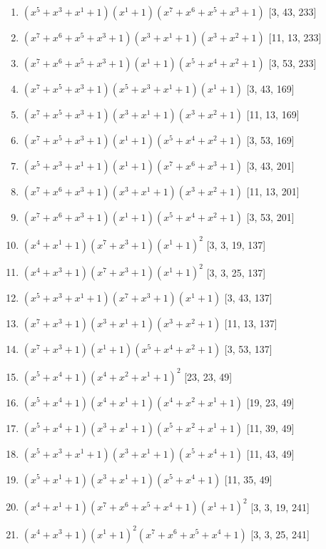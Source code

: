\documentclass[10pt,twocolumn]{article}
\begin{document}
\begin{enumerate}
\item $(x^{5} + x^{3} + x^{1} + 1)(x^{1} + 1)(x^{7} + x^{6} + x^{5} + x^{3} + 1)$  [3, 43, 233]
\item $(x^{7} + x^{6} + x^{5} + x^{3} + 1)(x^{3} + x^{1} + 1)(x^{3} + x^{2} + 1)$  [11, 13, 233]
\item $(x^{7} + x^{6} + x^{5} + x^{3} + 1)(x^{1} + 1)(x^{5} + x^{4} + x^{2} + 1)$  [3, 53, 233]
\item $(x^{7} + x^{5} + x^{3} + 1)(x^{5} + x^{3} + x^{1} + 1)(x^{1} + 1)$  [3, 43, 169]
\item $(x^{7} + x^{5} + x^{3} + 1)(x^{3} + x^{1} + 1)(x^{3} + x^{2} + 1)$  [11, 13, 169]
\item $(x^{7} + x^{5} + x^{3} + 1)(x^{1} + 1)(x^{5} + x^{4} + x^{2} + 1)$  [3, 53, 169]
\item $(x^{5} + x^{3} + x^{1} + 1)(x^{1} + 1)(x^{7} + x^{6} + x^{3} + 1)$  [3, 43, 201]
\item $(x^{7} + x^{6} + x^{3} + 1)(x^{3} + x^{1} + 1)(x^{3} + x^{2} + 1)$  [11, 13, 201]
\item $(x^{7} + x^{6} + x^{3} + 1)(x^{1} + 1)(x^{5} + x^{4} + x^{2} + 1)$  [3, 53, 201]
\item $(x^{4} + x^{1} + 1)(x^{7} + x^{3} + 1)(x^{1} + 1)^{2}$  [3, 3, 19, 137]
\item $(x^{4} + x^{3} + 1)(x^{7} + x^{3} + 1)(x^{1} + 1)^{2}$  [3, 3, 25, 137]
\item $(x^{5} + x^{3} + x^{1} + 1)(x^{7} + x^{3} + 1)(x^{1} + 1)$  [3, 43, 137]
\item $(x^{7} + x^{3} + 1)(x^{3} + x^{1} + 1)(x^{3} + x^{2} + 1)$  [11, 13, 137]
\item $(x^{7} + x^{3} + 1)(x^{1} + 1)(x^{5} + x^{4} + x^{2} + 1)$  [3, 53, 137]
\item $(x^{5} + x^{4} + 1)(x^{4} + x^{2} + x^{1} + 1)^{2}$  [23, 23, 49]
\item $(x^{5} + x^{4} + 1)(x^{4} + x^{1} + 1)(x^{4} + x^{2} + x^{1} + 1)$  [19, 23, 49]
\item $(x^{5} + x^{4} + 1)(x^{3} + x^{1} + 1)(x^{5} + x^{2} + x^{1} + 1)$  [11, 39, 49]
\item $(x^{5} + x^{3} + x^{1} + 1)(x^{3} + x^{1} + 1)(x^{5} + x^{4} + 1)$  [11, 43, 49]
\item $(x^{5} + x^{1} + 1)(x^{3} + x^{1} + 1)(x^{5} + x^{4} + 1)$  [11, 35, 49]
\item $(x^{4} + x^{1} + 1)(x^{7} + x^{6} + x^{5} + x^{4} + 1)(x^{1} + 1)^{2}$  [3, 3, 19, 241]
\item $(x^{4} + x^{3} + 1)(x^{1} + 1)^{2}(x^{7} + x^{6} + x^{5} + x^{4} + 1)$  [3, 3, 25, 241]

\end{enumerate}
\end{document}
